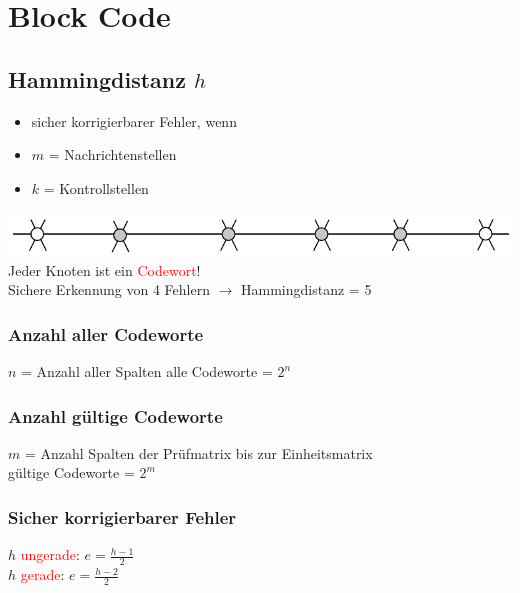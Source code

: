 
\section{Block Code}


\subsection{Hammingdistanz $h$}
\begin{itemize}
    \item sicher korrigierbarer Fehler, wenn
    \item $m$ = Nachrichtenstellen
    \item $k$ = Kontrollstellen
\end{itemize}
\includegraphics[width=\linewidth]{graphic/extern-reto/Hammingdistanz.png}
Jeder Knoten ist ein \textcolor{red}{Codewort}!\\
Sichere Erkennung von 4 Fehlern $\rightarrow$ Hammingdistanz = 5

\subsubsection{Anzahl aller Codeworte}
$n$ = Anzahl aller Spalten
\colorbox{lightlightgrey}{alle Codeworte = $2^n$}

\subsubsection{Anzahl gültige Codeworte}
$m$ = Anzahl Spalten der Prüfmatrix bis zur Einheitsmatrix\\
\colorbox{lightlightgrey}{gültige Codeworte = $2^m$}

\subsubsection{Sicher korrigierbarer Fehler}
$h$ \textcolor{red}{ungerade}: \colorbox{lightlightgrey}{$e = \frac{h - 1}{2}$}\hspace{3cm}\\
$h$ \textcolor{red}{gerade}: \colorbox{lightlightgrey}{$e = \frac{h - 2}{2}$}

